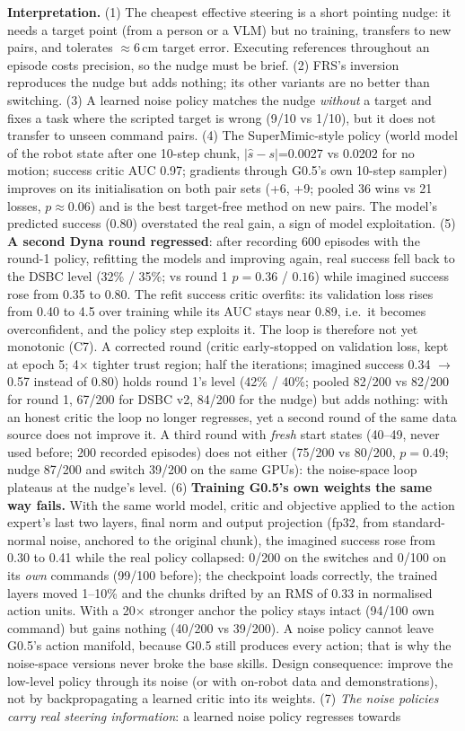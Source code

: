 \documentclass[10pt,a4paper]{article}
\begin{document}
\textbf{Interpretation.} (1) The cheapest effective steering is a short pointing nudge: it needs a target point (from a person or a VLM) but no training, transfers to new pairs, and tolerates $\approx$6\,cm target error. Executing references throughout an episode costs precision, so the nudge must be brief. (2) FRS's inversion reproduces the nudge but adds nothing; its other variants are no better than switching. (3) A learned noise policy matches the nudge \emph{without} a target and fixes a task where the scripted target is wrong (9/10 vs 1/10), but it does not transfer to unseen command pairs. (4) The SuperMimic-style policy (world model of the robot state after one 10-step chunk, $|\hat s-s|$=0.0027 vs 0.0202 for no motion; success critic AUC 0.97; gradients through G0.5's own 10-step sampler) improves on its initialisation on both pair sets (+6, +9; pooled 36 wins vs 21 losses, $p\approx0.06$) and is the best target-free method on new pairs. The model's predicted success (0.80) overstated the real gain, a sign of model exploitation. (5) \textbf{A second Dyna round regressed}: after recording 600 episodes with the round-1 policy, refitting the models and improving again, real success fell back to the DSBC level (32\% / 35\%; vs round 1 $p=0.36$ / $0.16$) while imagined success rose from 0.35 to 0.80. The refit success critic overfits: its validation loss rises from 0.40 to 4.5 over training while its AUC stays near 0.89, i.e.\ it becomes overconfident, and the policy step exploits it. The loop is therefore not yet monotonic (C7). A corrected round (critic early-stopped on validation loss, kept at epoch 5; 4$\times$ tighter trust region; half the iterations; imagined success 0.34 $\rightarrow$ 0.57 instead of 0.80) holds round 1's level (42\% / 40\%; pooled 82/200 vs 82/200 for round 1, 67/200 for DSBC v2, 84/200 for the nudge) but adds nothing: with an honest critic the loop no longer regresses, yet a second round of the same data source does not improve it. A third round with \emph{fresh} start states (40--49, never used before; 200 recorded episodes) does not either (75/200 vs 80/200, $p=0.49$; nudge 87/200 and switch 39/200 on the same GPUs): the noise-space loop plateaus at the nudge's level. (6) \textbf{Training G0.5's own weights the same way fails.} With the same world model, critic and objective applied to the action expert's last two layers, final norm and output projection (fp32, from standard-normal noise, anchored to the original chunk), the imagined success rose from 0.30 to 0.41 while the real policy collapsed: 0/200 on the switches and 0/100 on its \emph{own} commands (99/100 before); the checkpoint loads correctly, the trained layers moved 1--10\% and the chunks drifted by an RMS of 0.33 in normalised action units. With a 20$\times$ stronger anchor the policy stays intact (94/100 own command) but gains nothing (40/200 vs 39/200). A noise policy cannot leave G0.5's action manifold, because G0.5 still produces every action; that is why the noise-space versions never broke the base skills. Design consequence: improve the low-level policy through its noise (or with on-robot data and demonstrations), not by backpropagating a learned critic into its weights. (7) \emph{The noise policies carry real steering information}: a learned noise policy regresses towards 
\end{document}
